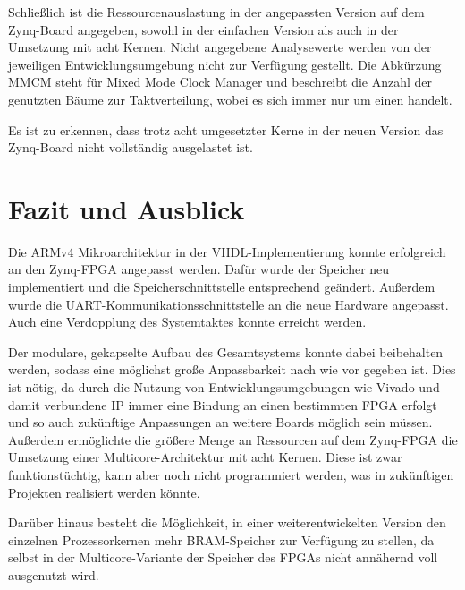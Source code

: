 \documentclass[11pt,a4paper,titlepage]{article}
\begin{document}
Schließlich ist die Ressourcenauslastung in der angepassten Version auf dem Zynq-Board angegeben, sowohl in der einfachen Version als auch in der Umsetzung mit acht Kernen. Nicht angegebene Analysewerte werden von der jeweiligen Entwicklungsumgebung nicht zur Verfügung gestellt. Die Abkürzung MMCM steht für Mixed Mode Clock Manager und beschreibt die Anzahl der genutzten Bäume zur Taktverteilung, wobei es sich immer nur um einen handelt.

Es ist zu erkennen, dass trotz acht umgesetzter Kerne in der neuen Version das Zynq-Board nicht vollständig ausgelastet ist.

\newpage
\section{Fazit und Ausblick}

Die ARMv4 Mikroarchitektur in der VHDL-Implementierung konnte erfolgreich an den Zynq-FPGA angepasst werden. Dafür wurde der Speicher neu implementiert und die Speicherschnittstelle entsprechend geändert. Außerdem wurde die UART-Kommunikationsschnittstelle an die neue Hardware angepasst. Auch eine Verdopplung des Systemtaktes konnte erreicht werden. 

Der modulare, gekapselte Aufbau des Gesamtsystems konnte dabei beibehalten werden, sodass eine möglichst große Anpassbarkeit nach wie vor gegeben ist. Dies ist nötig, da durch die Nutzung von Entwicklungsumgebungen wie Vivado und damit verbundene IP immer eine Bindung an einen bestimmten FPGA erfolgt und so auch zukünftige Anpassungen an weitere Boards möglich sein müssen.\\

Außerdem ermöglichte die größere Menge an Ressourcen auf dem Zynq-FPGA die Umsetzung einer Multicore-Architektur mit acht Kernen. Diese ist zwar funktionstüchtig, kann aber noch nicht programmiert werden, was in zukünftigen Projekten realisiert werden könnte.

Darüber hinaus besteht die Möglichkeit, in einer weiterentwickelten Version den einzelnen Prozessorkernen mehr BRAM-Speicher zur Verfügung zu stellen, da selbst in der Multicore-Variante der Speicher des FPGAs nicht annähernd voll ausgenutzt wird.



\newpage
{}
\end{document}
